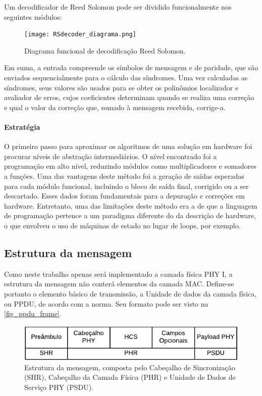 	Um decodificador de Reed Solomon pode ser dividido funcionalmente nos seguintes módulos:

	\begin{figure}[!htb]
		\caption{\label{RSDecoder_diagrama_logico} Diagrama funcional de decodificação Reed Solomon.}
		\centering
		\texttt{[image: RSdecoder\_diagrama.png]}
	\end{figure}

	Em suma, a entrada compreende os símbolos de mensagem e de paridade, que são enviados sequencialmente para o cálculo das síndromes. Uma vez calculadas as síndromes, seus valores são usados para se obter os polinômios localizador e avaliador de erros, cujos coeficientes determinam quando se realiza uma correção e qual o valor da correção que, somado à mensagem recebida, corrige-a.

	\paragraph{Estratégia}

	O primeiro passo para aproximar os algoritmos de uma solução em hardware foi procurar níveis de abstração intermediários. O nível encontrado foi a programação em alto nível, reduzindo módulos como multiplicadores e somadores a funções. Uma das vantagens deste método foi a geração de saídas esperadas para cada módulo funcional, incluindo o bloco de saída final, corrigido ou a ser descartado. Esses dados foram fundamentais para a depuração e correções em hardware. Entretanto, uma das limitações deste método era a de que a linguagem de programação pertence a um paradigma diferente do da descrição de hardware, o que envolveu o uso de máquinas de estado no lugar de loops, por exemplo.

	\subsection{Estrutura da mensagem}

	Como neste trabalho apenas será implementado a camada física PHY I, a estrutura da mensagem não conterá elementos da camada MAC. Define-se portanto o elemento básico de transmissão, a Unidade de dados da camada física, ou PPDU, de acordo com a norma. Seu formato pode ser visto na \autoref{fig_ppdu_frame}.

	\begin{figure}[h]
		\caption{\label{fig_ppdu_frame} Estrutura da mensagem, composta pelo Cabeçalho de Sincronização (SHR), Cabeçalho da Camada Física (PHR) e Unidade de Dados de Serviço PHY (PSDU).}
		\centering
		\includegraphics[width=0.5\textheight]{frame/PPDU.pdf}
	\end{figure}


